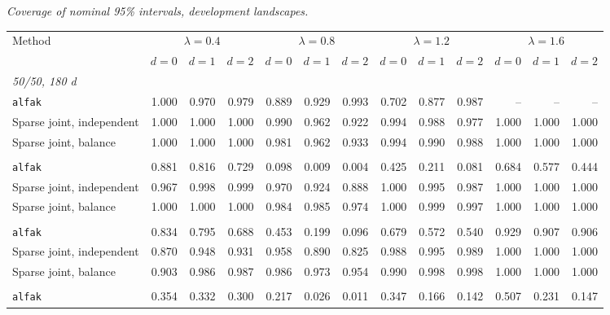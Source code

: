 \noindent\textit{Coverage of nominal 95\% intervals, development landscapes.}
\begin{center}
\scriptsize
\setlength{\tabcolsep}{2.5pt}
\begin{tabular}{l*{12}{r}}
\toprule
Method & \multicolumn{3}{c}{$\lambda=0.4$} & \multicolumn{3}{c}{$\lambda=0.8$} & \multicolumn{3}{c}{$\lambda=1.2$} & \multicolumn{3}{c}{$\lambda=1.6$} \\
\cmidrule(lr){2-4}\cmidrule(lr){5-7}\cmidrule(lr){8-10}\cmidrule(lr){11-13}
 & $d=0$ & $d=1$ & $d=2$ & $d=0$ & $d=1$ & $d=2$ & $d=0$ & $d=1$ & $d=2$ & $d=0$ & $d=1$ & $d=2$ \\
\midrule
\multicolumn{13}{l}{\textit{50/50, 180 d}} \\
\quad \texttt{alfak} & 1.000 & 0.970 & 0.979 & 0.889 & 0.929 & 0.993 & 0.702 & 0.877 & 0.987 & -- & -- & -- \\
\quad Sparse joint, independent & 1.000 & 1.000 & 1.000 & 0.990 & 0.962 & 0.922 & 0.994 & 0.988 & 0.977 & 1.000 & 1.000 & 1.000 \\
\quad Sparse joint, balance & 1.000 & 1.000 & 1.000 & 0.981 & 0.962 & 0.933 & 0.994 & 0.990 & 0.988 & 1.000 & 1.000 & 1.000 \\
\addlinespace[2pt]
\multicolumn{13}{l}{\textit{200/200, 180 d}} \\
\quad \texttt{alfak} & 0.881 & 0.816 & 0.729 & 0.098 & 0.009 & 0.004 & 0.425 & 0.211 & 0.081 & 0.684 & 0.577 & 0.444 \\
\quad Sparse joint, independent & 0.967 & 0.998 & 0.999 & 0.970 & 0.924 & 0.888 & 1.000 & 0.995 & 0.987 & 1.000 & 1.000 & 1.000 \\
\quad Sparse joint, balance & 1.000 & 1.000 & 1.000 & 0.984 & 0.985 & 0.974 & 1.000 & 0.999 & 0.997 & 1.000 & 1.000 & 1.000 \\
\addlinespace[2pt]
\multicolumn{13}{l}{\textit{200/200, 360 d}} \\
\quad \texttt{alfak} & 0.834 & 0.795 & 0.688 & 0.453 & 0.199 & 0.096 & 0.679 & 0.572 & 0.540 & 0.929 & 0.907 & 0.906 \\
\quad Sparse joint, independent & 0.870 & 0.948 & 0.931 & 0.958 & 0.890 & 0.825 & 0.988 & 0.995 & 0.989 & 1.000 & 1.000 & 1.000 \\
\quad Sparse joint, balance & 0.903 & 0.986 & 0.987 & 0.986 & 0.973 & 0.954 & 0.990 & 0.998 & 0.998 & 1.000 & 1.000 & 1.000 \\
\addlinespace[2pt]
\multicolumn{13}{l}{\textit{500/700, 360 d}} \\
\quad \texttt{alfak} & 0.354 & 0.332 & 0.300 & 0.217 & 0.026 & 0.011 & 0.347 & 0.166 & 0.142 & 0.507 & 0.231 & 0.147 \\

\end{tabular}
\end{center}
